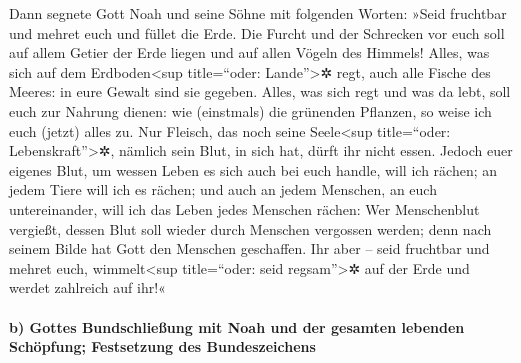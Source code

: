  Dann segnete Gott Noah und seine Söhne mit folgenden
Worten: »Seid fruchtbar und mehret euch und füllet die Erde.
 Die Furcht und der Schrecken vor euch soll auf allem
Getier der Erde liegen und auf allen Vögeln des Himmels! Alles, was sich
auf dem Erdboden\textless sup title=``oder: Lande''\textgreater✲ regt,
auch alle Fische des Meeres: in eure Gewalt sind sie gegeben.
 Alles, was sich regt und was da lebt, soll euch zur
Nahrung dienen: wie (einstmals) die grünenden Pflanzen, so weise ich
euch (jetzt) alles zu.  Nur Fleisch, das noch seine
Seele\textless sup title=``oder: Lebenskraft''\textgreater✲, nämlich
sein Blut, in sich hat, dürft ihr nicht essen.  Jedoch
euer eigenes Blut, um wessen Leben es sich auch bei euch handle, will
ich rächen; an jedem Tiere will ich es rächen; und auch an jedem
Menschen, an euch untereinander, will ich das Leben jedes Menschen
rächen:  Wer Menschenblut vergießt, dessen Blut soll
wieder durch Menschen vergossen werden; denn nach seinem Bilde hat Gott
den Menschen geschaffen.  Ihr aber -- seid fruchtbar und
mehret euch, wimmelt\textless sup title=``oder: seid
regsam''\textgreater✲ auf der Erde und werdet zahlreich auf ihr!«

\hypertarget{b-gottes-bundschlieuxdfung-mit-noah-und-der-gesamten-lebenden-schuxf6pfung-festsetzung-des-bundeszeichens}{%
\paragraph{b) Gottes Bundschließung mit Noah und der gesamten lebenden
Schöpfung; Festsetzung des
Bundeszeichens}\label{b-gottes-bundschlieuxdfung-mit-noah-und-der-gesamten-lebenden-schuxf6pfung-festsetzung-des-bundeszeichens}}

